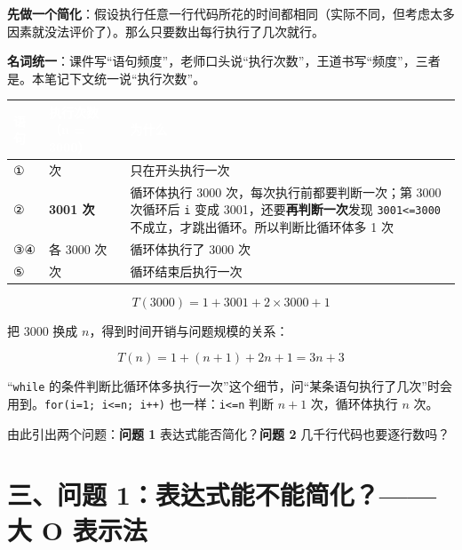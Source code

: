 \documentclass[10.5pt,a4paper,oneside]{article}
\newcommand{\hlred}[1]{\textcolor{wdred}{\bfseries #1}}
\newcommand{\uln}[1]{\CJKunderline[format=\color{wdred},thickness=0.9pt,depth=0.28em]{#1}}
\begin{document}
\textbf{先做一个简化}：假设执行任意一行代码所花的时间都相同（实际不同，但考虑太多因素就没法评价了）。那么只要数出每行执行了几次就行。

\begin{fixbox}

\textbf{名词统一}：课件写“语句频度”，老师口头说“执行次数”，王道书写“频度”，三者是\uln{同一个意思：某条语句被执行的次数}。本笔记下文统一说“执行次数”。

\end{fixbox}

{
\begin{xltabular}{\linewidth}{>{\hsize\raggedright\arraybackslash}X>{\hsize\raggedright\arraybackslash}X>{\hsize\raggedright\arraybackslash}X}
\textcolor{white}{\bfseries 语句} & \textcolor{white}{\bfseries 执行次数（n = 3000）} & \textcolor{white}{\bfseries 为什么} \\
\endfirsthead
① & 1 次 & 只在开头执行一次 \\ \hline
② & \hlred{3001 次} & 循环体执行 3000 次，每次执行前都要判断一次；第 3000 次循环后 \texttt{i} 变成 3001，还要\textbf{再判断一次}发现 \texttt{3001\textless{}=3000} 不成立，才跳出循环。所以判断比循环体多 1 次 \\ \hline
③④ & 各 3000 次 & 循环体执行了 3000 次 \\ \hline
⑤ & 1 次 & 循环结束后执行一次 \\ \hline
\end{xltabular}\par\vspace{4pt}}

\[T(3000) = 1 + 3001 + 2\times 3000 + 1\]

把 3000 换成 \(n\)，得到时间开销与问题规模的关系：

\[T(n) = 1 + (n+1) + 2n + 1 = 3n + 3\]

\begin{pitfallbox}

“\texttt{while}
的条件判断比循环体多执行一次”这个细节，问“某条语句执行了几次”时会用到。\texttt{for(i=1;\ i\textless{}=n;\ i++)}
也一样：\texttt{i\textless{}=n} 判断 \(n+1\) 次，循环体执行 \(n\) 次。

\end{pitfallbox}

由此引出两个问题：\textbf{问题 1} 表达式能否简化？\textbf{问题 2}
几千行代码也要逐行数吗？

\hypertarget{ux4e09ux95eeux9898-1ux8868ux8fbeux5f0fux80fdux4e0dux80fdux7b80ux5316ux5927-o-ux8868ux793aux6cd5}{%
\section{三、问题 1：表达式能不能简化？------大 O
表示法}\label{ux4e09ux95eeux9898-1ux8868ux8fbeux5f0fux80fdux4e0dux80fdux7b80ux5316ux5927-o-ux8868ux793aux6cd5}}
\end{document}
